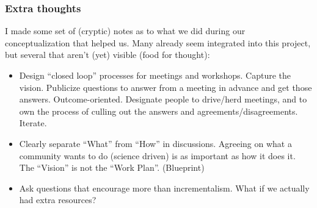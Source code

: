 \begin{frame}
\frametitle{Extra thoughts}

I made some set of (cryptic) notes as to what we did during our 
conceptualization that helped us. Many already seem integrated into this 
project, but several that aren't (yet) visible (food for thought):
\begin{itemize}
\item Design ``closed loop'' processes for meetings and workshops. Capture the vision. Publicize questions to answer from a meeting in advance and get those answers. Outcome-oriented. Designate people to drive/herd meetings, and to own the process of culling out the answers and agreements/disagreements. Iterate.
\item Clearly separate ``What'' from ``How'' in discussions. Agreeing on what a community wants to do (science driven) is as important as how it does it. The ``Vision'' is not the ``Work Plan''. (Blueprint)
\item Ask questions that encourage more than incrementalism. What if we actually had extra resources? 
\end{itemize}

\end{frame}


